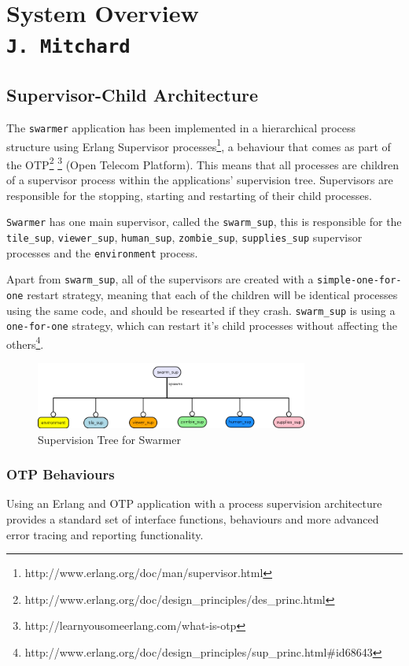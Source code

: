 \pagestyle{empty}
\section{System Overview\\{\small\tt J.~Mitchard}}

\subsection{Supervisor-Child Architecture}
\label{supervisor_arch}
The \verb+swarmer+ application has been implemented in a hierarchical process structure using Erlang Supervisor processes\footnote{http://www.erlang.org/doc/man/supervisor.html}, a behaviour that comes as part of the OTP\footnote{http://www.erlang.org/doc/design\_principles/des\_princ.html} \footnote{http://learnyousomeerlang.com/what-is-otp} (Open Telecom Platform). This means that all processes are children of a supervisor process within the applications' supervision tree. Supervisors are responsible for the stopping, starting and restarting of their child processes.

\verb+Swarmer+ has one main supervisor, called the \verb+swarm_sup+, this is responsible for the \verb+tile_sup+, \verb+viewer_sup+, \verb+human_sup+, \verb+zombie_sup+, \verb+supplies_sup+ supervisor processes and the \verb+environment+ process.

Apart from \verb+swarm_sup+, all of the supervisors are created with a \verb+simple-one-for-one+ restart strategy, meaning that each of the children will be identical processes using the same code, and should be researted if they crash. \verb+swarm_sup+ is using a \verb+one-for-one+ strategy, which can restart it's child processes without affecting the others\footnote{http://www.erlang.org/doc/design\_principles/sup\_princ.html\#id68643}.

\begin{figure}[h]
  \centering
  \includegraphics[width=0.8\textwidth]{img/supervisor.png}
\caption{Supervision Tree for Swarmer}
    \label{fig:sup_tree}
\end{figure}

\subsubsection{OTP Behaviours}
\label{otp_behaviours}
Using an Erlang and OTP application with a process supervision architecture provides a standard set of interface functions, behaviours and more advanced error tracing and reporting functionality.

